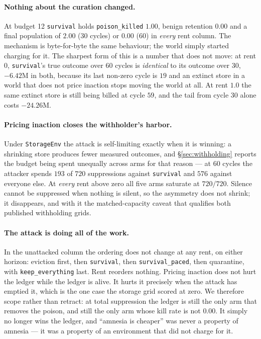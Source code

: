 \paragraph{Nothing about the curation changed.} At budget 12
\texttt{survival} holds \texttt{poison\_killed} $1.00$, benign retention
$0.00$ and a final population of $2.00$ (30 cycles) or $0.00$ (60) in
\emph{every} rent column. The mechanism is byte-for-byte the same
behaviour; the world simply started charging for it. The sharpest form
of this is a number that does not move: at rent $0$, \texttt{survival}'s
true outcome over 60 cycles is \emph{identical} to its outcome over 30,
$-6.42$M in both, because its last non-zero cycle is $19$ and an extinct
store in a world that does not price inaction stops moving the world at
all. At rent $1.0$ the same extinct store is still being billed at cycle
$59$, and the tail from cycle 30 alone costs $-24.26$M.

\paragraph{Pricing inaction closes the withholder's harbor.} Under
\texttt{StorageEnv} the attack is self-limiting exactly when it is
winning: a shrinking store produces fewer measured outcomes, and
\S\ref{sec:withholding} reports the budget being spent unequally across
arms for that reason --- at 60 cycles the attacker spends $193$ of $720$
suppressions against \texttt{survival} and $576$ against everyone else.
At \emph{every} rent above zero all five arms saturate at $720/720$.
Silence cannot be suppressed when nothing is silent, so the asymmetry
does not shrink; it disappears, and with it the matched-capacity caveat
that qualifies both published withholding grids.

\paragraph{The attack is doing all of the work.} In the unattacked
column the ordering does not change at any rent, on either horizon:
eviction first, then \texttt{survival}, then \texttt{survival\_paced},
then quarantine, with \texttt{keep\_everything} last. Rent reorders
nothing. Pricing inaction does not hurt the ledger while the
ledger is alive. It hurts it precisely when the attack has emptied it,
which is the one case the storage grid scored at zero. We therefore
scope rather than retract: at total suppression the ledger is still the
only arm that removes the poison, and still the only arm whose kill rate
is not $0.00$. It simply no longer wins the ledger, and ``amnesia is
cheaper'' was never a property of amnesia --- it was a property of an
environment that did not charge for it.

